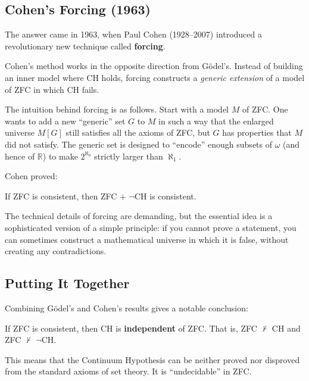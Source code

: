 \subsection{Cohen's Forcing (1963)}

The answer came in 1963, when Paul Cohen (1928--2007) introduced a revolutionary new technique called \textbf{forcing}.

Cohen's method works in the opposite direction from G\"odel's. Instead of building an inner model where CH holds, forcing constructs a \emph{generic extension} of a model of ZFC in which CH fails.

The intuition behind forcing is as follows. Start with a model $M$ of ZFC. One wants to add a new ``generic'' set $G$ to $M$ in such a way that the enlarged universe $M[G]$ still satisfies all the axioms of ZFC, but $G$ has properties that $M$ did not satisfy. The generic set is designed to ``encode'' enough subsets of $\omega$ (and hence of $\mathbb{R}$) to make $2^{\aleph_0}$ strictly larger than $\aleph_1$.

Cohen proved:

\begin{theorem}[Cohen, 1963]
\label{thm:cohen-nch}
If ZFC is consistent, then ZFC $+$ $\neg$CH is consistent.
\end{theorem}

The technical details of forcing are demanding, but the essential idea is a sophisticated version of a simple principle: if you cannot prove a statement, you can sometimes construct a mathematical universe in which it is false, without creating any contradictions.

\subsection{Putting It Together}

Combining G\"odel's and Cohen's results gives a notable conclusion:

\begin{theorem}\label{thm:ch-independence}
If ZFC is consistent, then CH is \textbf{independent} of ZFC. That is, ZFC $\not\vdash$ CH and ZFC $\not\vdash$ $\neg$CH.
\end{theorem}

This means that the Continuum Hypothesis can be neither proved nor disproved from the standard axioms of set theory. It is ``undecidable'' in ZFC.

